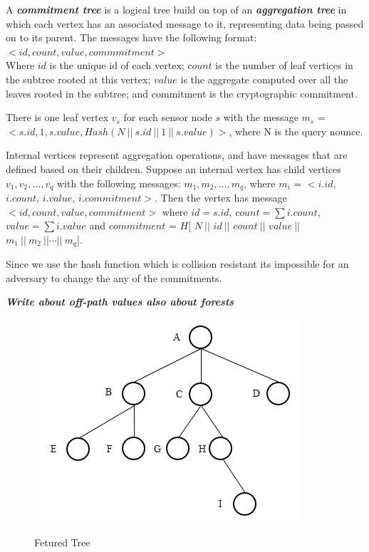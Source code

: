 	\begin{definition}
		A \textbf{\textit{commitment tree}} is a logical tree build on top of an \textbf{\textit{aggregation tree}} in which each vertex has an associated message to it, representing data being passed on to its parent. The messages have the following format:\\

		$<id, count, value, commmitment>$\\
		\newline
		Where $id$ is the unique id of each vertex; $count$ is the number of leaf vertices in the subtree rooted at this vertex; $value$ is the aggregate computed over all the leaves rooted in the subtree; and commitment is the cryptographic commitment.

	\end{definition}

	There is one leaf vertex $v_{s}$ for each sensor node $s$ with the message $m_{s}$ = $< s.id, 1,s.value, Hash( N\ ||\  s.id\ ||\  1\  ||\  s.value) > $, where N is the query nounce.

	Internal vertices represent aggregation operations, and have messages that are defined based on their children. Suppose an internal vertex has child vertices $v_{1}, v_{2},\dotsc, v_{q}$ with the following messages: $m_{1}, m_{2},\dotsc, m_{q}$, where $m_{i}$ = $<i.id$, $i.count$, $i.value$, $i.commitment>$.
	Then the vertex has message $<id, count, value, commitment>$ where $id = s.id$, $count = \sum{i.count}$, $value = \sum{i.value}$ and $commitment$ = $H[$ $N\ || $ $id\ || $ $count\ || $ $value\ ||$ $m_{1}\ ||\ m_{2}\ || \dotsb ||\ m_{q}]$.

	Since we use the hash function which is collision resistant its impossible for an adversary to change the any of the commitments.

	\textit{\textbf{Write about off-path values also about forests }}

	\begin{figure}[hp]
		\centering
		\includegraphics[scale=0.8]{images/featured-tree.png}\\
		\caption{Fetured Tree}
	\end{figure}

